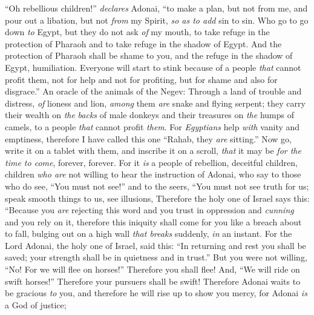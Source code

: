 \begin{biblechapter} %
 “Oh rebellious children!” \textit{declares} Adonai,
\verse “to make a plan, but not from me, 
and pour out a libation, but not \textit{from} my Spirit, 
\textit{so as to add} sin to sin.
\verse Who go to go down \textit{to} Egypt, 
but they do not ask \textit{of} my mouth, 
to take refuge in the protection of Pharaoh 
and to take refuge in the shadow of Egypt.
\verse And the protection of Pharaoh shall be shame to you, 
and the refuge in the shadow of Egypt, humiliation.
\verse Everyone will start to stink because of a people \textit{that} cannot profit them, not for help and not for profiting, 
but for shame and also for disgrace.”
 An oracle of the animals of the Negev:
\verse Through a land of trouble and distress, 
\textit{of} lioness and lion, 
\textit{among} them \textit{are} snake and flying serpent; 
they carry their wealth on \textit{the} \textit{backs} of male donkeys 
and their treasures on \textit{the} humps of camels, 
to a people \textit{that} cannot profit \textit{them}.
\verse For \textit{Egyptians} help \textit{with} vanity and emptiness, 
therefore I have called this one “Rahab, they \textit{are} sitting.”
\verse Now go, write it on a tablet with them, 
and inscribe it on a scroll, 
\textit{that} it may be \textit{for the time to come}, 
forever, forever.
\verse For it \textit{is} a people of rebellion, deceitful children, 
children \textit{who are} not willing to hear the instruction of Adonai,
\verse who say to those who do see, “You must not see!” 
and to the seers, “You must not see truth for us; 
speak smooth things to us, 
see illusions,
\verse Therefore the holy one of Israel says this:
\verse “Because you \textit{are} rejecting this word 
and you trust in oppression and \textit{cunning} 
and you rely on it,
\verse therefore this iniquity shall come for you like a breach about to fall, 
bulging out on a high wall \textit{that breaks} suddenly, \textit{in} an instant.
\verse For the Lord Adonai, the holy one of Israel, said this: “In returning and rest you shall be saved; 
your strength shall be in quietness and in trust.”
\verse But you were not willing,
\verse “No! For we will flee on horses!” Therefore you shall flee! 
And, “We will ride on swift horses!” Therefore your pursuers shall be swift!
 Therefore Adonai waits to be gracious \textit{to} you, 
and therefore he will rise up to show you mercy, 
for Adonai \textit{is} a God of justice; 

\end{biblechapter}
